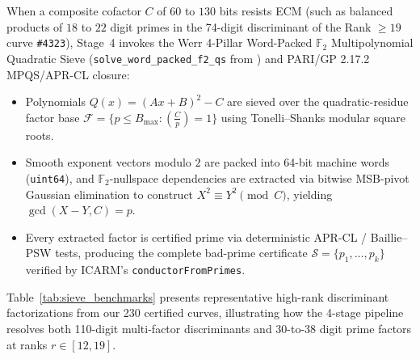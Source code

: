 \documentclass[10pt,a4paper]{article}
\theoremstyle{plain}
\theoremstyle{definition}
\theoremstyle{remark}
\begin{document}
When a composite cofactor $C$ of $60$ to $130$ bits resists ECM (such as balanced products of $18$ to $22$ digit primes in the 74-digit discriminant of the Rank $\ge 19$ curve \texttt{\#4323}), Stage~4 invokes the Werr 4-Pillar Word-Packed $\mathbb{F}_2$ Multipolynomial Quadratic Sieve (\texttt{solve\_word\_packed\_f2\_qs} from \cite{dagli2026sieve}) and PARI/GP 2.17.2 MPQS/APR-CL closure:
\begin{itemize}[leftmargin=2em]
    \item Polynomials $Q(x) = (Ax + B)^2 - C$ are sieved over the quadratic-residue factor base $\mathcal{F} = \{p \le B_{\max} : (\frac{C}{p}) = 1\}$ using Tonelli--Shanks modular square roots.
    \item Smooth exponent vectors modulo $2$ are packed into 64-bit machine words (\texttt{uint64}), and $\mathbb{F}_2$-nullspace dependencies are extracted via bitwise MSB-pivot Gaussian elimination to construct $X^2 \equiv Y^2 \pmod C$, yielding $\gcd(X - Y, C) = p$.
    \item Every extracted factor is certified prime via deterministic APR-CL / Baillie--PSW tests, producing the complete bad-prime certificate $\mathcal{S} = \{p_1, \dots, p_k\}$ verified by ICARM's \texttt{conductorFromPrimes}.
\end{itemize}

Table~\ref{tab:sieve_benchmarks} presents representative high-rank discriminant factorizations from our 230 certified curves, illustrating how the 4-stage pipeline resolves both 110-digit multi-factor discriminants and 30-to-38 digit prime factors at ranks $r \in [12, 19]$.
\end{document}
